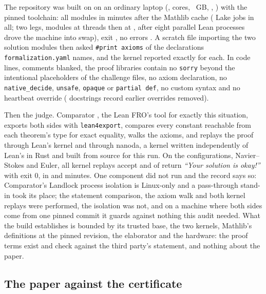 \documentclass[11pt]{article}
\newcommand{\lean}[1]{\texttt{#1}}
\begin{document}
{\sloppy The repository was built on \BuildDate{} on an ordinary laptop (\BuildMachine, \BuildCpus{}
cores, \BuildMemory~GB, \BuildOS, \BuildArch) with the pinned toolchain: all \BuildJobs{}
modules in \BuildMinutes{} minutes after the Mathlib cache (\BuildJobsTotal{} Lake jobs in
all; two legs, \BuildLegOne{} modules at \BuildLegOneThreads{} threads then \BuildLegTwo{} at
\BuildLegTwoThreads, after eight parallel Lean processes drove the machine into swap), exit
\BuildExit, no errors \cite{Records}. A scratch file importing the two solution
modules then asked \lean{\#print axioms} of the \AxiomDecls{} declarations
\lean{formalization.yaml} names, and the kernel reported exactly \AxiomList{} for each. In
code lines, comments blanked, the proof libraries contain no \lean{sorry} beyond the
\HygSorryChal{} intentional placeholders of the challenge files, no axiom declaration, no
\lean{native\_decide}, \lean{unsafe}, \lean{opaque} or \lean{partial def}, no custom syntax
and no heartbeat override (\HygHeartbeatComments{} docstrings record earlier overrides
removed).\par}

Then the judge. Comparator \cite{Comparator}, the Lean FRO's tool for exactly this
situation, exports both sides with \lean{lean4export}, compares every constant reachable
from each theorem's type for exact equality, walks the axioms, and replays the proof through
Lean's kernel and through nanoda, a kernel written independently of Lean's in Rust and built
from source for this run. On the \ComparatorConfigs{} configurations, Navier--Stokes and
Euler, all \ComparatorKernelAccepts{} kernel replays accept and \ComparatorAccepted{} of
\ComparatorConfigs{} return \emph{``Your solution is okay!''} with exit $0$, in
\ComparatorMinutesNS{} and \ComparatorMinutesEuler{} minutes. One component did not run and
the record says so: Comparator's Landlock process isolation is Linux-only and a pass-through
stand-in took its place; the statement comparison, the axiom walk and both kernel replays
were performed, the isolation was not, and on a machine where both sides come from one
pinned commit it guards against nothing this audit needed. What the build establishes is
bounded by its trusted base, the two kernels, Mathlib's definitions at the pinned revision,
the elaborator and the hardware: the proof terms exist and check against the third party's
statement, and nothing about the paper.

\subsection{The paper against the certificate}\label{sec:map}
\end{document}
